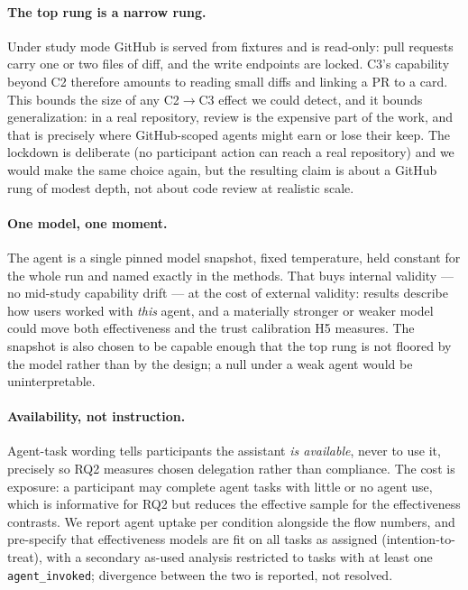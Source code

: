 \documentclass[11pt]{article}
\newcommand{\code}[1]{\texttt{#1}}
\begin{document}
\paragraph{The top rung is a narrow rung.} Under study mode GitHub is served from
fixtures and is read-only: pull requests carry one or two files of diff, and the
write endpoints are locked. C3's capability beyond C2 therefore amounts to
reading small diffs and linking a PR to a card. This bounds the size of any
C2$\rightarrow$C3 effect we could detect, and it bounds generalization: in a real
repository, review is the expensive part of the work, and that is precisely where
GitHub-scoped agents might earn or lose their keep. The lockdown is deliberate
(no participant action can reach a real repository) and we would make the same
choice again, but the resulting claim is about a GitHub rung of modest depth, not
about code review at realistic scale.

\paragraph{One model, one moment.} The agent is a single pinned model snapshot,
fixed temperature, held constant for the whole run and named exactly in the
methods. That buys internal validity --- no mid-study capability drift --- at the
cost of external validity: results describe how users worked with \emph{this}
agent, and a materially stronger or weaker model could move both effectiveness
and the trust calibration H5 measures. The snapshot is also chosen to be capable
enough that the top rung is not floored by the model rather than by the design;
a null under a weak agent would be uninterpretable.

\paragraph{Availability, not instruction.} Agent-task wording tells participants
the assistant \emph{is available}, never to use it, precisely so RQ2 measures
chosen delegation rather than compliance. The cost is exposure: a participant may
complete agent tasks with little or no agent use, which is informative for RQ2
but reduces the effective sample for the effectiveness contrasts. We report agent
uptake per condition alongside the flow numbers, and pre-specify that
effectiveness models are fit on all tasks as assigned (intention-to-treat), with a
secondary as-used analysis restricted to tasks with at least one
\code{agent\_invoked}; divergence between the two is reported, not resolved.
\end{document}
